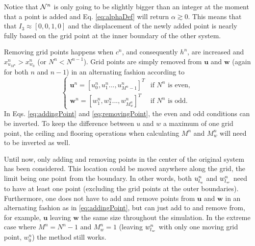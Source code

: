 Notice that $\mathcal{N}^n$ is only going to be slightly bigger than an integer at the moment that a point is added and Eq. \eqref{eq:alphaDef} will return $\alpha \gtrsim 0$.
This means that that $I_3 \approx [0, 0, 1, 0]$ and the displacement of the newly added point is nearly fully based on the grid point at the inner boundary of the other system. %

Removing grid points happens when $c^n$, and consequently $h^n$, are increased and $x_{u_{M^n}}^n > x_{w_0}^n$ (or $ N^n <  N^{n-1}$). %
Grid points are simply removed from $\mathbf{u}$ and $\mathbf{w}$ (again for both $n$ and $n-1$) in an alternating fashion according to
\begin{equation}\label{eq:removingPoint}
\begin{cases}
    \mathbf{u}^n = [u_0^n, u_1^n ..., u_{M^n-1}^n]^T & \text{if $N^n$ is even}, \\
     \mathbf{w}^n = [w_1^n, w_2^n ..., w_{M_w^n}^n]^T & \text{if $N^n$ is odd}.
    \end{cases}
\end{equation}
In Eqs. \eqref{eq:addingPoint} and \eqref{eq:removingPoint}, the even and odd conditions can be inverted. To keep the difference between $u$ and $w$ a maximum of one grid point, the ceiling and flooring operations when calculating $M^n$ and $M_w^n$ will need to be inverted as well.

Until now, only adding and removing points in the center of the original system has been considered. This location could be moved anywhere along the grid, the limit being one point from the boundary. In other words, both $u_{l_u}^n$ and $w_{l_w}^n$ need to have at least one point (excluding the grid points at the outer boundaries). Furthermore, one does not have to add and remove points from $\mathbf{u}$ and $\mathbf{w}$ in an alternating fashion as in \eqref{eq:addingPoint}, but can just add to and remove from, for example, $\mathbf{u}$ leaving $\mathbf{w}$ the same size throughout the simulation. In the extreme case where $M^n = N^n - 1$ and $M_w^n = 1$ (leaving $w_{l_w}^n$ with only one moving grid point, $w_0^n$) the method still works.

